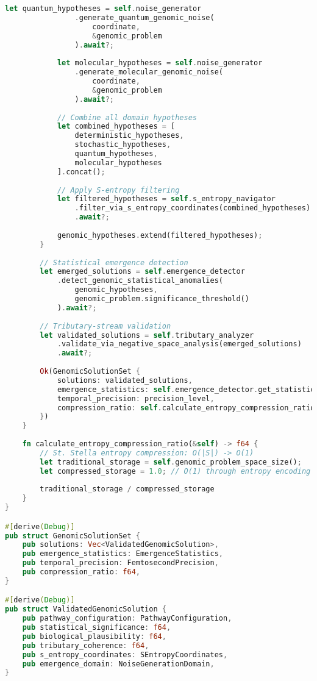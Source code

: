 \documentclass[12pt,a4paper]{article}
\begin{document}
\begin{lstlisting}[language=Rust, caption=Gospel-Harare Femtosecond Genomic Engine]
            let quantum_hypotheses = self.noise_generator
                .generate_quantum_genomic_noise(
                    coordinate,
                    &genomic_problem
                ).await?;
            
            let molecular_hypotheses = self.noise_generator
                .generate_molecular_genomic_noise(
                    coordinate,
                    &genomic_problem
                ).await?;
            
            // Combine all domain hypotheses
            let combined_hypotheses = [
                deterministic_hypotheses,
                stochastic_hypotheses, 
                quantum_hypotheses,
                molecular_hypotheses
            ].concat();
            
            // Apply S-entropy filtering
            let filtered_hypotheses = self.s_entropy_navigator
                .filter_via_s_entropy_coordinates(combined_hypotheses)
                .await?;
            
            genomic_hypotheses.extend(filtered_hypotheses);
        }
        
        // Statistical emergence detection
        let emerged_solutions = self.emergence_detector
            .detect_genomic_statistical_anomalies(
                genomic_hypotheses,
                genomic_problem.significance_threshold()
            ).await?;
        
        // Tributary-stream validation
        let validated_solutions = self.tributary_analyzer
            .validate_via_negative_space_analysis(emerged_solutions)
            .await?;
        
        Ok(GenomicSolutionSet {
            solutions: validated_solutions,
            emergence_statistics: self.emergence_detector.get_statistics(),
            temporal_precision: precision_level,
            compression_ratio: self.calculate_entropy_compression_ratio(),
        })
    }
    
    fn calculate_entropy_compression_ratio(&self) -> f64 {
        // St. Stella entropy compression: O(|S|) -> O(1)
        let traditional_storage = self.genomic_problem_space_size();
        let compressed_storage = 1.0; // O(1) through entropy encoding
        
        traditional_storage / compressed_storage
    }
}

#[derive(Debug)]
pub struct GenomicSolutionSet {
    pub solutions: Vec<ValidatedGenomicSolution>,
    pub emergence_statistics: EmergenceStatistics,
    pub temporal_precision: FemtosecondPrecision,
    pub compression_ratio: f64,
}

#[derive(Debug)]
pub struct ValidatedGenomicSolution {
    pub pathway_configuration: PathwayConfiguration,
    pub statistical_significance: f64,
    pub biological_plausibility: f64,
    pub tributary_coherence: f64,
    pub s_entropy_coordinates: SEntropyCoordinates,
    pub emergence_domain: NoiseGenerationDomain,
}
\end{lstlisting}
\end{document}
